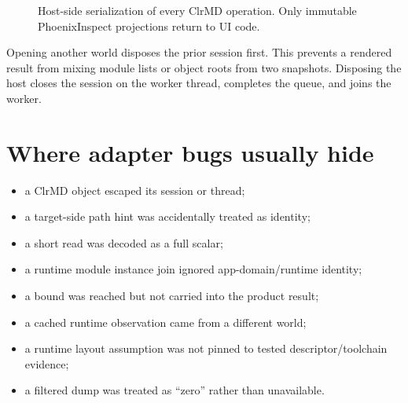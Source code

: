 \documentclass[11pt,oneside,openany]{book}
\newcommand{\typeName}[1]{\texttt{\detokenize{#1}}}
\begin{document}
\begin{figure}[htbp]
\centering
{}
\caption{Host-side serialization of every ClrMD operation. Only immutable PhoenixInspect projections return to UI code.}
\label{fig:adapter-thread}
\end{figure}

Opening another world disposes the prior session first. This prevents a rendered result from mixing module lists or object roots from two snapshots. Disposing the host closes the session on the worker thread, completes the queue, and joins the worker.

\section{Where adapter bugs usually hide}

\begin{itemize}
  \item a ClrMD object escaped its session or thread;
  \item a target-side path hint was accidentally treated as identity;
  \item a short read was decoded as a full scalar;
  \item a runtime module instance join ignored app-domain/runtime identity;
  \item a bound was reached but not carried into the product result;
  \item a cached runtime observation came from a different world;
  \item a runtime layout assumption was not pinned to tested descriptor/toolchain evidence;
  \item a filtered dump was treated as ``zero'' rather than unavailable.
\end{itemize}
\end{document}
